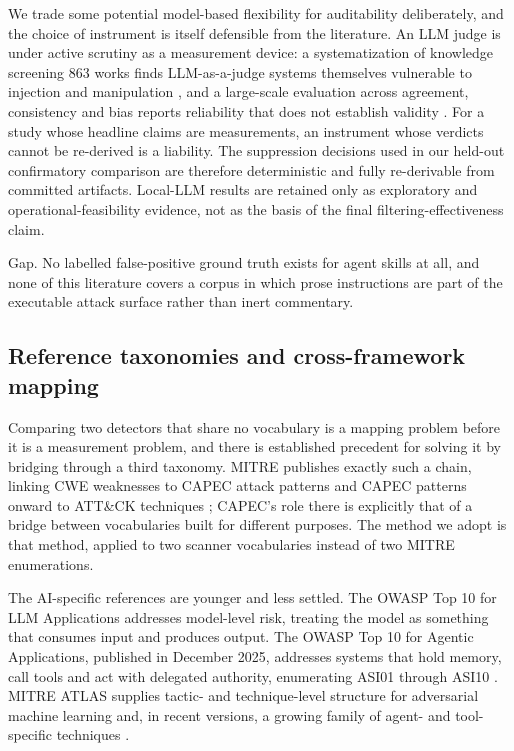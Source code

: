 \documentclass[conference]{IEEEtran}
\begin{document}
We trade some potential model-based flexibility for auditability deliberately, and the choice of instrument is itself defensible from the literature. An LLM judge is under active scrutiny as a measurement device: a systematization of knowledge screening 863 works finds LLM-as-a-judge systems themselves vulnerable to injection and manipulation \cite{ref19}, and a large-scale evaluation across agreement, consistency and bias reports reliability that does not establish validity \cite{ref20}. For a study whose headline claims are measurements, an instrument whose verdicts cannot be re-derived is a liability. The suppression decisions used in our held-out confirmatory comparison are therefore deterministic and fully re-derivable from committed artifacts. Local-LLM results are retained only as exploratory and operational-feasibility evidence, not as the basis of the final filtering-effectiveness claim.

Gap. No labelled false-positive ground truth exists for agent skills at all, and none of this literature covers a corpus in which prose instructions are part of the executable attack surface rather than inert commentary.

\subsection{Reference taxonomies and cross-framework mapping}

Comparing two detectors that share no vocabulary is a mapping problem before it is a measurement problem, and there is established precedent for solving it by bridging through a third taxonomy. MITRE publishes exactly such a chain, linking CWE weaknesses to CAPEC attack patterns and CAPEC patterns onward to ATT\&CK techniques \cite{ref17}; CAPEC's role there is explicitly that of a bridge between vocabularies built for different purposes. The method we adopt is that method, applied to two scanner vocabularies instead of two MITRE enumerations.

The AI-specific references are younger and less settled. The OWASP Top 10 for LLM Applications \cite{ref8} addresses model-level risk, treating the model as something that consumes input and produces output. The OWASP Top 10 for Agentic Applications, published in December 2025, addresses systems that hold memory, call tools and act with delegated authority, enumerating ASI01 through ASI10 \cite{ref9}. MITRE ATLAS supplies tactic- and technique-level structure for adversarial machine learning and, in recent versions, a growing family of agent- and tool-specific techniques \cite{ref10}.
\end{document}

